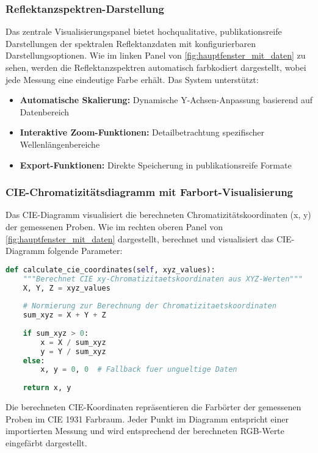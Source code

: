 \subsubsection{Reflektanzspektren-Darstellung}

Das zentrale Visualisierungspanel bietet hochqualitative, publikationsreife Darstellungen der spektralen Reflektanzdaten mit konfigurierbaren Darstellungsoptionen. Wie im linken Panel von \ref{fig:hauptfenster_mit_daten} zu sehen, werden die Reflektanzspektren automatisch farbkodiert dargestellt, wobei jede Messung eine eindeutige Farbe erhält. Das System unterstützt:

\begin{itemize}
    \item \textbf{Automatische Skalierung:} Dynamische Y-Achsen-Anpassung basierend auf Datenbereich
    \item \textbf{Interaktive Zoom-Funktionen:} Detailbetrachtung spezifischer Wellenlängenbereiche
    \item \textbf{Export-Funktionen:} Direkte Speicherung in publikationsreife Formate
\end{itemize}

\subsubsection{CIE-Chromatizitätsdiagramm mit Farbort-Visualisierung}

Das CIE-Diagramm visualisiert die berechneten Chromatizitätskoordinaten (x, y) der gemessenen Proben. Wie im rechten oberen Panel von \ref{fig:hauptfenster_mit_daten} dargestellt, berechnet und visualisiert das CIE-Diagramm folgende Parameter:

\begin{lstlisting}[language=Python, caption=CIE-Koordinaten Berechnung]
def calculate_cie_coordinates(self, xyz_values):
    """Berechnet CIE xy-Chromatizitaetskoordinaten aus XYZ-Werten"""
    X, Y, Z = xyz_values
    
    # Normierung zur Berechnung der Chromatizitaetskoordinaten
    sum_xyz = X + Y + Z
    
    if sum_xyz > 0:
        x = X / sum_xyz
        y = Y / sum_xyz
    else:
        x, y = 0, 0  # Fallback fuer ungueltige Daten
    
    return x, y
\end{lstlisting}

Die berechneten CIE-Koordinaten repräsentieren die Farbörter der gemessenen Proben im CIE 1931 Farbraum. Jeder Punkt im Diagramm entspricht einer importierten Messung und wird entsprechend der berechneten RGB-Werte eingefärbt dargestellt.

